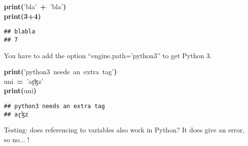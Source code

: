 \documentclass[output=inprep,
		biblatex
		]{LSP/langsci}\usepackage[]{graphicx}\usepackage[]{color}
\makeatletter
\newcommand{\hlnum}[1]{\textcolor[rgb]{0.502,0,0.502}{\textbf{#1}}}%
\newcommand{\hlstr}[1]{\textcolor[rgb]{0.651,0.522,0}{#1}}%
\newcommand{\hlopt}[1]{\textcolor[rgb]{1,0,0.502}{\textbf{#1}}}%
\newcommand{\hlstd}[1]{\textcolor[rgb]{0,0,0}{#1}}%
\newcommand{\hlkwa}[1]{\textcolor[rgb]{0.733,0.475,0.467}{\textbf{#1}}}%
\newenvironment{kframe}{%
 \def\at@end@of@kframe{}%
 \ifinner\ifhmode%
  \def\at@end@of@kframe{\end{minipage}}%
  \begin{minipage}{\columnwidth}%
 \fi\fi%
 \def\FrameCommand##1{\hskip\@totalleftmargin \hskip-\fboxsep
 \colorbox{shadecolor}{##1}\hskip-\fboxsep
     \hskip-\linewidth \hskip-\@totalleftmargin \hskip\columnwidth}%
 \MakeFramed {\advance\hsize-\width
   \@totalleftmargin\z@ \linewidth\hsize
   \@setminipage}}%
 {\par\unskip\endMakeFramed%
 \at@end@of@kframe}
\newenvironment{knitrout}{}{} %
\makeatother
\begin{document}
\begin{knitrout}\scriptsize
{}\color{fgcolor}\begin{kframe}
\noindent
\ttfamily
\hlstd{}\hlkwa{print}\hlstd{}\hlopt{(}\hlstd{}\hlstr{'bla'}\hlstd{\ }\hlopt{+\ }\hlstd{}\hlstr{'bla'}\hlstd{}\hlopt{)}\hspace*{\fill}\\
\hlstd{}\hlkwa{print}\hlstd{}\hlopt{(}\hlstd{}\hlnum{3}\hlstd{}\hlopt{+}\hlstd{}\hlnum{4}\hlstd{}\hlopt{)}\hlstd{}\hspace*{\fill}
\mbox{}
\normalfont
\normalsize

\begin{verbatim}
## blabla
## 7
\end{verbatim}
\end{kframe}
\end{knitrout}

You have to add the option ``engine.path='python3'' to get Python 3.

\begin{knitrout}\scriptsize
{}\color{fgcolor}\begin{kframe}
\noindent
\ttfamily
\hlstd{}\hlkwa{print}\hlstd{}\hlopt{(}\hlstd{}\hlstr{'python3\ needs\ an\ extra\ tag'}\hlstd{}\hlopt{)}\hspace*{\fill}\\
\hlstd{uni\ }\hlopt{=\ }\hlstd{}\hlstr{'aɽɮz'}\hlstd{}\hspace*{\fill}\\
\hlkwa{print}\hlstd{}\hlopt{(}\hlstd{uni}\hlopt{)}\hlstd{}\hspace*{\fill}
\mbox{}
\normalfont
\normalsize

\begin{verbatim}
## python3 needs an extra tag
## aɽɮz
\end{verbatim}
\end{kframe}
\end{knitrout}

Testing: does referencing to variables also work in Python? It does give an error, so no... !





\end{document}
